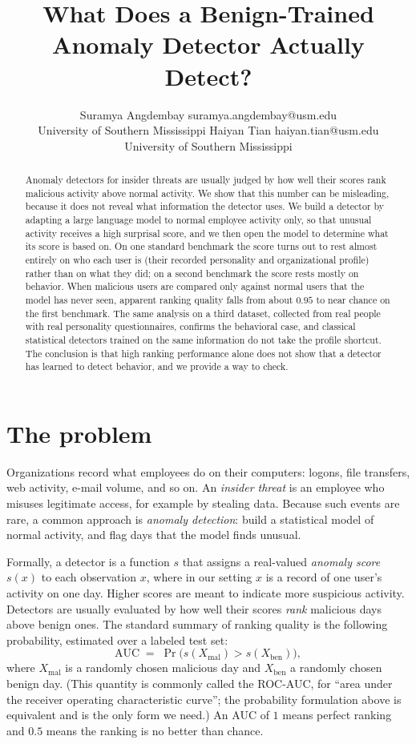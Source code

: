\documentclass[10pt]{article}
\title{What Does a Benign-Trained Anomaly Detector Actually Detect?}
\author{\name Suramya Angdembay \email suramya.angdembay@usm.edu \\
\addr University of Southern Mississippi
\AND
\name Haiyan Tian \email haiyan.tian@usm.edu \\
\addr University of Southern Mississippi}
\begin{document}
\maketitle

\begin{abstract}
Anomaly detectors for insider threats are usually judged by how well
their scores rank malicious activity above normal activity. We show that
this number can be misleading, because it does not reveal what
information the detector uses. We build a detector by adapting a large
language model to normal employee activity only, so that unusual
activity receives a high surprisal score, and we then open the model to
determine what its score is based on. On one standard benchmark the
score turns out to rest almost entirely on who each user is (their
recorded personality and organizational profile) rather than on what
they did; on a second benchmark the score rests mostly on behavior. When
malicious users are compared only against normal users that the model
has never seen, apparent ranking quality falls from about $0.95$ to near
chance on the first benchmark. The same analysis on a third dataset,
collected from real people with real personality questionnaires,
confirms the behavioral case, and classical statistical detectors
trained on the same information do not take the profile shortcut. The
conclusion is that high ranking performance alone does not show that a
detector has learned to detect behavior, and we provide a way to check.
\end{abstract}

\section{The problem}

Organizations record what employees do on their computers: logons, file
transfers, web activity, e-mail volume, and so on. An \emph{insider
threat} is an employee who misuses legitimate access, for example by
stealing data. Because such events are rare, a common approach is
\emph{anomaly detection}: build a statistical model of normal activity,
and flag days that the model finds unusual.

Formally, a detector is a function $s$ that assigns a real-valued
\emph{anomaly score} $s(x)$ to each observation $x$, where in our setting
$x$ is a record of one user's activity on one day. Higher scores are
meant to indicate more suspicious activity. Detectors are usually
evaluated by how well their scores \emph{rank} malicious days above
benign ones. The standard summary of ranking quality is the following
probability, estimated over a labeled test set:
\begin{equation}
\mathrm{AUC} \;=\; \Pr\bigl( s(X_{\mathrm{mal}}) > s(X_{\mathrm{ben}})
\bigr),
\end{equation}
where $X_{\mathrm{mal}}$ is a randomly chosen malicious day and
$X_{\mathrm{ben}}$ a randomly chosen benign day. (This quantity is
commonly called the ROC-AUC, for ``area under the receiver operating
characteristic curve''; the probability formulation above is equivalent
and is the only form we need.) An AUC of $1$ means perfect ranking and
$0.5$ means the ranking is no better than chance.
\end{document}
